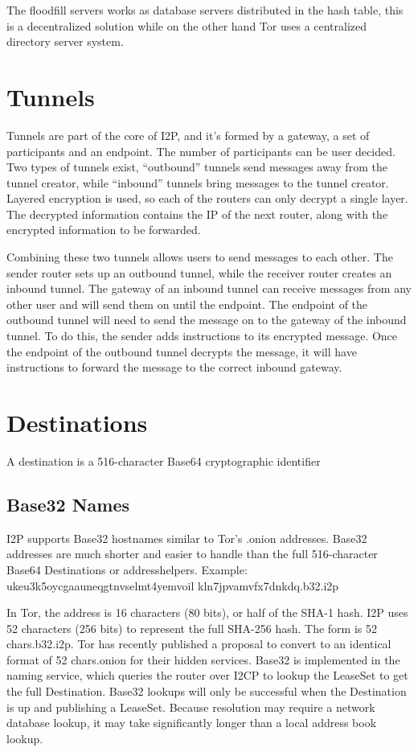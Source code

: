 \documentclass[a4paper,twocolumn,12pt]{article}
\begin{document}
The floodfill servers works as database servers distributed in the hash table,
this is a decentralized solution while on the other hand Tor\cite{tor-design}
uses a centralized directory server system.

\section{Tunnels}

Tunnels are part of the core of I2P, and it's formed by a gateway, a set of
participants and an endpoint. The number of participants can be user decided.
Two types of tunnels exist, ``outbound'' tunnels send messages away from the
tunnel creator, while ``inbound'' tunnels bring messages to the tunnel creator.
Layered encryption is used, so each of the routers can only decrypt a single
layer. The decrypted information contains the IP of the next router, along with
the encrypted information to be forwarded.

Combining these two tunnels allows users to send messages to each other. The
sender router sets up an outbound tunnel, while the receiver router creates an
inbound tunnel. The gateway of an inbound tunnel can receive messages from any
other user and will send them on until the endpoint. The endpoint of the
outbound tunnel will need to send the message on to the gateway of the inbound
tunnel. To do this, the sender adds instructions to its encrypted message. Once
the endpoint of the outbound tunnel decrypts the message, it will have
instructions to forward the message to the correct inbound gateway.

\section{Destinations}

A destination is a 516-character Base64\cite{rfc4648} cryptographic identifier

\subsection{Base32 Names}

I2P supports Base32\cite{rfc4648} hostnames similar to Tor's\cite{tor-design} .onion
addresses. Base32 addresses are much shorter and easier to handle than the full
516-character Base64 Destinations or addresshelpers. Example:
ukeu3k5oycgaauneqgtnvselmt4yemvoil
kln7jpvamvfx7dnkdq.b32.i2p

In Tor\cite{tor-design}, the address is 16 characters (80 bits), or half of the
SHA-1 hash.  \cite{tor-hiddenservice} I2P uses 52 characters (256 bits) to
represent the full SHA-256 hash. The form is {52 chars}.b32.i2p.
Tor\cite{tor-design} has recently published a proposal to convert to an
identical format of {52 chars}.onion for their hidden services. Base32 is
implemented in the naming service, which queries the router over I2CP to lookup
the LeaseSet to get the full Destination. Base32 lookups will only be
successful when the Destination is up and publishing a LeaseSet. Because
resolution may require a network database lookup, it may take significantly
longer than a local address book lookup.
\end{document}
